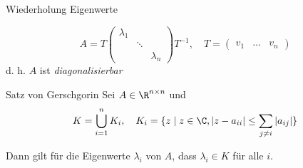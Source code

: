\begin{bonus}{Wiederholung Eigenwerte}
\begin{itemize}
              \[
                  A = T
                  \begin{pmatrix}
                      \lambda_1 &        &           \\
                                & \ddots &           \\
                                &        & \lambda_n
                  \end{pmatrix}
                  T^{-1}, \quad T =
                  \begin{pmatrix}
                      v_1 & \ldots & v_n
                  \end{pmatrix}
              \]
              d. h. $A$ ist \emph{diagonalisierbar}
    \end{itemize}
\end{bonus}

\begin{defi}{Satz von Gerschgorin}
    Sei $A \in \R^{n \times n}$ und
    \[
        K = \bigcup_{i = 1}^{n} K_i, \quad K_i = \{ z \mid z \in \C, |z - a_{ii}| \leq \sum_{j \neq i} | a_{ij} | \}
    \]

    Dann gilt für die Eigenwerte $\lambda_i$ von $A$, dass $\lambda_i \in K$ für alle $i$.
\end{defi}

